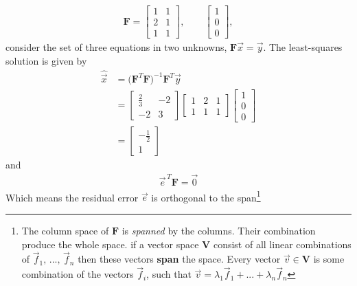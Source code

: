 \documentclass[12pt,a4paper,oneside]{book}
\begin{document}
\begin{onehalfspace}
\begin{example}
\begin{equation*}
		\begin{aligned}
			\mathbf{F} = \begin{bmatrix} 1&1\\2&1\\1&1 \end{bmatrix}, \qquad 
			\begin{bmatrix} 1\\0\\0 \end{bmatrix},
		\end{aligned}
	\end{equation*}
	consider the set of three equations in two unknowns, 
	$\mathbf{F}\vec{x}=\vec{y}$. The least-squares solution is given by
	\begin{equation*}
		\begin{aligned}
			\hat{\vec{x}} &= 
			\Big(\mathbf{F}^T\mathbf{F}\Big)^{-1}\mathbf{F}^T\vec{y} \\[6pt]
			&= \begin{bmatrix} \frac{2}{3} & -2 \\-2 & 3 \end{bmatrix} 
			\begin{bmatrix} 1 & 2 & 1 \\1 & 1 & 1 \end{bmatrix} \begin{bmatrix} 
			1\\ 0\\ 0 \end{bmatrix} \\[6pt]
			&= \begin{bmatrix} -\frac{1}{2}\\ 1 \end{bmatrix}
		\end{aligned}
	\end{equation*}
	and 
	\begin{equation*}
		\begin{aligned}
			\vec{e}^{\,T}\mathbf{F} = \vec{0} 
		\end{aligned}
	\end{equation*}
	Which means the residual error $\vec{e}$ is orthogonal to the 
	span\footnote{The column space of $\mathbf{F}$ is \textit{spanned} by the 
	columns. Their combination produce the whole space. if a vector space 
	$\mathbf{V}$ consist of all linear combinations of 
	$\vec{f}_1,\,...,\,\vec{f}_n$ then these vectors \textbf{span} the space. 
	Every vector $\vec{v}\in\mathbf{V}$ is some combination of the vectors 
	$\vec{f}_i$, such that $\vec{v}=\lambda_1\vec{f}_1+...+\lambda_n\vec{f}_n$} 

\end{example}
\end{onehalfspace}
\end{document}

